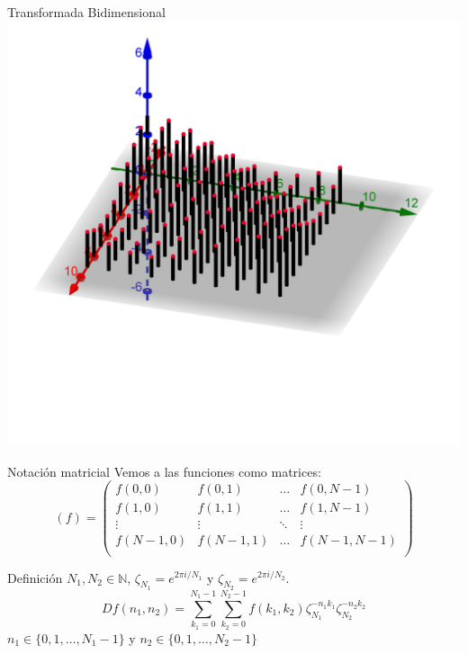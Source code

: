 \documentclass[11pt,compress]{beamer}
\begin{document}
\begin{frame}{Transformada Bidimensional}
{\includegraphics[scale=0.5]{./images/s3.png}
}
\end{frame}

\begin{frame}
\begin{block}{Notación matricial}
Vemos a las funciones como matrices:
\[
    (f) = \begin{pmatrix}
    f(0,0) & f(0,1) & \dots & f(0,N-1) \\
    f(1,0) & f(1,1) & \dots & f(1,N-1) \\
    \vdots & \vdots & \ddots & \vdots \\
    f(N-1,0) & f(N-1,1) & \dots & f(N-1,N-1) \\
    \end{pmatrix}
\]
\end{block}
\end{frame}

\begin{frame}
\begin{block}{Definición}
     $N_1, N_2 \in \mathbb{N}$, $ \zeta_{N_{1}} = e^{2\pi i / N_1}$ y $ \zeta_{N_{2}} = e^{2\pi i / N_2}$.  
    \[
        Df(n_1, n_2) = \sum_{k_1=0}^{N_1 - 1}\sum_{k_2=0}^{N_2 - 1} f(k_1, k_2) \zeta_{N_{1}}^{-n_1k_1}  \zeta_{N_{2}}^{-n_2k_2} 
    \]
     $n_1 \in \{ 0,1,\dots , N_1 - 1\}$ y $n_2 \in \{ 0,1,\dots , N_2 - 1\}$
\end{block}
\end{frame}
\end{document}
